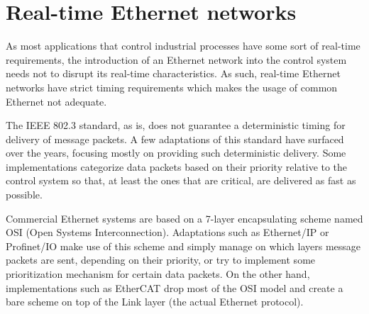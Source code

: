 \section{Real-time Ethernet networks}\label{sec:rt-networks}

As most applications that control industrial processes have some sort of real-time requirements, the introduction of an Ethernet network into the control system needs not to disrupt its real-time characteristics.
As such, real-time Ethernet networks have strict timing requirements which makes the usage of common Ethernet not adequate.

The IEEE 802.3 standard, as is, does not guarantee a deterministic timing for delivery of message packets.
A few adaptations of this standard have surfaced over the years, focusing mostly on providing such deterministic delivery.
Some implementations categorize data packets based on their priority relative to the control system so that, at least the ones that are critical, are delivered as fast as possible.

Commercial Ethernet systems are based on a 7-layer encapsulating scheme named OSI (Open Systems Interconnection).
Adaptations such as Ethernet/IP or Profinet/IO make use of this scheme and simply manage on which layers message packets are sent, depending on their priority, or try to implement some prioritization mechanism for certain data packets.
On the other hand, implementations such as EtherCAT drop most of the OSI model and create a bare scheme on top of the Link layer (the actual Ethernet protocol).
